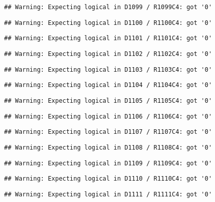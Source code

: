 \documentclass[
]{article}
\begin{document}
\begin{verbatim}
## Warning: Expecting logical in D1099 / R1099C4: got '0'
\end{verbatim}

\begin{verbatim}
## Warning: Expecting logical in D1100 / R1100C4: got '0'
\end{verbatim}

\begin{verbatim}
## Warning: Expecting logical in D1101 / R1101C4: got '0'
\end{verbatim}

\begin{verbatim}
## Warning: Expecting logical in D1102 / R1102C4: got '0'
\end{verbatim}

\begin{verbatim}
## Warning: Expecting logical in D1103 / R1103C4: got '0'
\end{verbatim}

\begin{verbatim}
## Warning: Expecting logical in D1104 / R1104C4: got '0'
\end{verbatim}

\begin{verbatim}
## Warning: Expecting logical in D1105 / R1105C4: got '0'
\end{verbatim}

\begin{verbatim}
## Warning: Expecting logical in D1106 / R1106C4: got '0'
\end{verbatim}

\begin{verbatim}
## Warning: Expecting logical in D1107 / R1107C4: got '0'
\end{verbatim}

\begin{verbatim}
## Warning: Expecting logical in D1108 / R1108C4: got '0'
\end{verbatim}

\begin{verbatim}
## Warning: Expecting logical in D1109 / R1109C4: got '0'
\end{verbatim}

\begin{verbatim}
## Warning: Expecting logical in D1110 / R1110C4: got '0'
\end{verbatim}

\begin{verbatim}
## Warning: Expecting logical in D1111 / R1111C4: got '0'
\end{verbatim}
\end{document}
